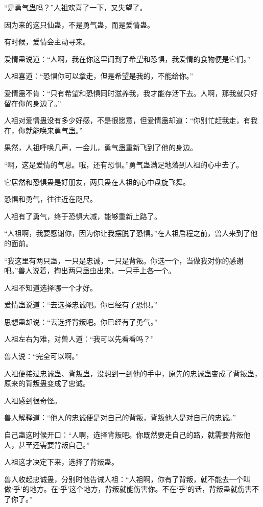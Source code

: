 \begin{this_body}
“是勇气蛊吗？”人祖欢喜了一下，又失望了。

因为来的这只仙蛊，不是勇气蛊，而是爱情蛊。

有时候，爱情会主动寻来。

爱情蛊说道：“人啊，我在你这里闻到了希望和恐惧，我爱情的食物便是它们。”

人祖喜道：“恐惧你可以拿走，但是希望是我的，不能给你。”

爱情蛊不肯：“只有希望和恐惧同时滋养我，我才能存活下去。人啊，那我就只好留在你的身边了。”

人祖对爱情蛊没有多少好感，不是很愿意，但爱情蛊却道：“你别忙赶我走，有我在，你就能唤来勇气蛊。”

果然，人祖呼唤几声，一会儿，勇气蛊重新飞到了他的身边。

“啊，这是爱情的气息。哦，还有恐惧。”勇气蛊满足地落到人祖的心中去了。

它居然和恐惧蛊是好朋友，两只蛊在人祖的心中盘旋飞舞。

恐惧和勇气，往往近在咫尺。

人祖有了勇气，终于恐惧大减，能够重新上路了。

“人祖啊，我要感谢你，因为你让我摆脱了恐惧。”在人祖启程之前，兽人来到了他的面前。

“我这里有两只蛊，一只是忠诚，一只是背叛。你选一个，当做我对你的感谢吧。”兽人说着，掏出两只蛊虫出来，一只手上各一个。

人祖不知道选择哪一个才好。

爱情蛊说道：“去选择忠诚吧。你已经有了恐惧。”

思想蛊却说：“去选择背叛吧。你已经有了勇气。”

人祖左右为难，对兽人道：“我可以先看看吗？”

兽人说：“完全可以啊。”

人祖便接过忠诚蛊、背叛蛊，没想到一到他的手中，原先的忠诚蛊变成了背叛蛊，原来的背叛蛊变成了忠诚。

人祖感到很奇怪。

兽人解释道：“他人的忠诚便是对自己的背叛，背叛他人是对自己的忠诚。”

自己蛊这时候开口：“人啊，选择背叛吧。你既然要走自己的路，就需要背叛他人，甚至还需要背叛自己。”

人祖这才决定下来，选择了背叛蛊。

兽人收起忠诚蛊，分别时他告诫人祖：“人祖啊，你有了背叛，就不能去一个叫做‘乎’的地方。在‘乎’这个地方，背叛就能伤害你。不在‘乎’的话，背叛蛊就伤害不了你了。”


\end{this_body}

